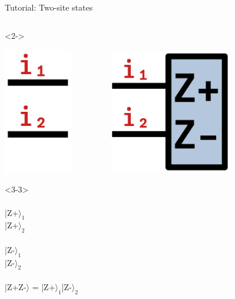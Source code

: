 \begin{frame}[fragile]{Tutorial: Two-site states}
\begin{columns}
\begin{column}{5cm}
\begin{onlyenv}<2->
\vspace*{-0.2cm}
\begin{center}
\includegraphics[width=0.225\textwidth]{
  slides/assets/i1i2.png
} \ \ \ \ \ \ \ \ \
\includegraphics[width=0.4\textwidth]{
  slides/assets/ZpZm12.png
}
\end{center}
\vspace*{0.0cm}
\end{onlyenv}

\begin{onlyenv}<3-3>
~\\
~\\
|Z+$\rangle_1$ \\
|Z+$\rangle_2$ \\
~\\
|Z-$\rangle_1$ \\
|Z-$\rangle_2$ \\
~\\
|Z+Z-$\rangle$ = |Z+$\rangle_1$|Z-$\rangle_2$ \\
~\\
\end{onlyenv}


\end{column}
\end{columns}
\end{frame}

